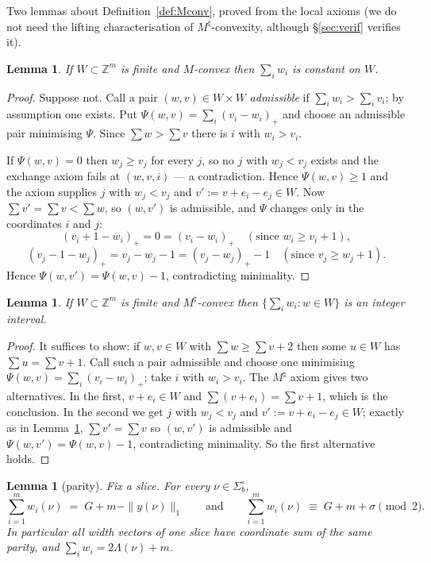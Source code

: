 \documentclass[11pt]{article}
\theoremstyle{plain}
\newtheorem{lemma}[theorem]{Lemma}
\theoremstyle{definition}
\newcommand{\Z}{\mathbb{Z}}
\newcommand{\pospart}[1]{\left(#1\right)_{+}}
\begin{document}
Two lemmas about Definition~\ref{def:Mconv}, proved from the local axioms (we do not need
the lifting characterisation of $M^\natural$-convexity, although \S\ref{sec:verif}
verifies it).

\begin{lemma}\label{lem:constsum}
If $W\subset\Z^m$ is finite and $M$-convex then $\sum_i w_i$ is constant on $W$.
\end{lemma}

\begin{proof}
Suppose not. Call a pair $(w,v)\in W\times W$ \emph{admissible} if $\sum_i w_i>\sum_i v_i$;
by assumption one exists. Put $\Psi(w,v)=\sum_i\pospart{v_i-w_i}$ and choose an admissible
pair minimising $\Psi$. Since $\sum w>\sum v$ there is $i$ with $w_i>v_i$.

If $\Psi(w,v)=0$ then $w_j\ge v_j$ for every $j$, so no $j$ with $w_j<v_j$ exists and the
exchange axiom fails at $(w,v,i)$ --- a contradiction. Hence $\Psi(w,v)\ge1$ and the axiom
supplies $j$ with $w_j<v_j$ and $v':=v+e_i-e_j\in W$. Now $\sum v'=\sum v<\sum w$, so
$(w,v')$ is admissible, and $\Psi$ changes only in the coordinates $i$ and $j$:
\[
  \pospart{v_i+1-w_i}=0=\pospart{v_i-w_i}\quad(\text{since } w_i\ge v_i+1),
\]
\[
  \pospart{v_j-1-w_j}=v_j-w_j-1=\pospart{v_j-w_j}-1\quad(\text{since } v_j\ge w_j+1).
\]
Hence $\Psi(w,v')=\Psi(w,v)-1$, contradicting minimality.
\end{proof}

\begin{lemma}\label{lem:interval}
If $W\subset\Z^m$ is finite and $M^\natural$-convex then
$\bigl\{\sum_i w_i : w\in W\bigr\}$ is an integer interval.
\end{lemma}

\begin{proof}
It suffices to show: if $w,v\in W$ with $\sum w\ge\sum v+2$ then some $u\in W$ has
$\sum u=\sum v+1$. Call such a pair admissible and choose one minimising
$\Psi(w,v)=\sum_i\pospart{v_i-w_i}$; take $i$ with $w_i>v_i$. The $M^\natural$ axiom gives
two alternatives. In the first, $v+e_i\in W$ and $\sum(v+e_i)=\sum v+1$, which is the
conclusion. In the second we get $j$ with $w_j<v_j$ and $v':=v+e_i-e_j\in W$; exactly as
in Lemma~\ref{lem:constsum}, $\sum v'=\sum v$ so $(w,v')$ is admissible and
$\Psi(w,v')=\Psi(w,v)-1$, contradicting minimality. So the first alternative holds.
\end{proof}

\begin{lemma}[parity]\label{lem:parity}
Fix a slice. For every $\nu\in\Sigma_b^\circ$,
\[
   \sum_{i=1}^m w_i(\nu)\;=\;G+m-\|y(\nu)\|_1
   \qquad\text{and}\qquad
   \sum_{i=1}^m w_i(\nu)\;\equiv\;G+m+\sigma \pmod 2 .
\]
In particular all width vectors of one slice have coordinate sum of the same parity, and
$\sum_i w_i = 2\Lambda(\nu)+m$.
\end{lemma}
\end{document}
